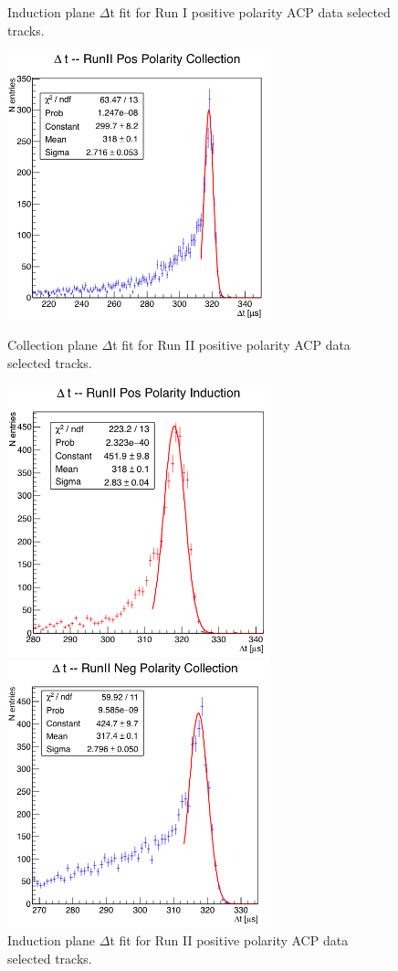 \begin{figure}[h!]
\begin{minipage}{0.40\textwidth}
\caption{Induction plane $\Delta$t fit  for Run I positive polarity ACP data  selected tracks.}
\label{fig:Run1PosIndFit}
\end{minipage}
\begin{minipage}{0.40\textwidth}
\centering
\includegraphics[width=3in]{images/RunIIPosCol.png}
\caption{Collection plane $\Delta$t fit for Run II positive polarity ACP data  selected tracks.}
\label{fig:Run2PosColFit}
\end{minipage}\hfill
\begin{minipage}{0.40\textwidth}
\centering
\includegraphics[width=3in]{images/RunIIPosInd.png}
\caption{Induction plane $\Delta$t fit for Run II positive polarity ACP data  selected tracks.}
\label{fig:Run2PosIndFit}
\end{minipage}
\begin{minipage}{0.40\textwidth}
\centering
\includegraphics[width=3in]{images/RunIINegCol.png}

\end{minipage}
\end{figure}
